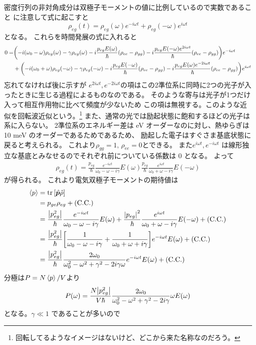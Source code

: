 \documentclass[11pt,dvipdfmx,a4paper]{jsarticle}
\newcommand{\cc}{\text{(C.C.)}}
\begin{document}
密度行列の非対角成分は双極子モーメントの値に比例しているので実数であること
に注意して式に起こすと
\begin{equation}
	\rho_{eg}(t) = \rho_{eg}( \omega) e^{-i\omega t} + \rho_{eg}(-\omega) e^{ i\omega t}
\end{equation}
となる。
これらを時間発展の式に入れると
\begin{align}
	0 =& \qty(-i(\omega_0-\omega)\rho_{eg}( \omega) -\gamma\rho_{eg}( \omega) -i\frac{p_{eg}E( \omega)}{\hbar}(\rho_{ee}-\rho_{gg})-i\frac{p_{eg}E(-\omega)e^{ 2i\omega t}}{\hbar}(\rho_{ee}-\rho_{gg}))e^{-i\omega t} \notag\\
	  &+ \qty(-i(\omega_0+\omega)\rho_{eg}(-\omega) -\gamma\rho_{eg}(-\omega) -i\frac{p_{eg}E(-\omega)}{\hbar}(\rho_{ee}-\rho_{gg})-i\frac{p_{eg}E( \omega)e^{-2i\omega t}}{\hbar}(\rho_{ee}-\rho_{gg}))e^{ i\omega t}
\end{align}
忘れてなければ後に示すが
\(e^{2i\omega t}, e^{-2i\omega t}\)の項はこの2準位系に同時に2つの光子が入ったときに生じる過程によるものなのである。
そのような寄与は光子が1つだけ入って相互作用物に比べて頻度が少ないため
この項は無視する。このような近似を回転波近似という。\footnote{回転してるようなイメージはないけど、どこから来た名称なのだろう。}
また、通常の光では励起状態に飽和するほどの光子は系に入らない。
2準位系のエネルギー差は eV オーダーなのに対し、熱ゆらぎは 10 meV のオーダーであるためであるため、
励起した電子はすぐさま基底状態に戻ると考えられる。
これより\(\rho_{gg} = 1,\,\rho_{ee} = 0\)とできる。
また\(e^{i\omega t}, e^{-i\omega t}\) は線形独立な基底とみなせるのでそれぞれ前についている係数は 0 となる。
よって
\begin{align}
	\rho_{eg}(t)
	= \frac{p_{eg}}{\hbar}\frac{e^{-i\omega t}}{\omega_0 - \omega - i\gamma} E( \omega)
	  \frac{p_{eg}}{\hbar}\frac{e^{ i\omega t}}{\omega_0 + \omega - i\gamma} E(-\omega)
\end{align}
が得られる。
これより電気双極子モーメントの期待値は
\begin{align}
	\ev{p} &= \tr\qty[\hat{\vb*{p}}\hat{\rho}]\\
	&=p_{ge}\rho_{eg}+\cc\\
	&=\frac{\abs{p_{eg}^2}}{\hbar}\frac{e^{-i\omega t}}{\omega_0 - \omega - i\gamma} E( \omega)
	+ \frac{\abs{p_{eg}}^2}{\hbar}\frac{e^{ i\omega t}}{\omega_0 + \omega - i\gamma} E(-\omega)
	+ \cc\\
	&=\frac{\abs{p_{eg}^2}}{\hbar}\qty[
		 \frac{1}{\omega_0 - \omega - i\gamma}
		+\frac{1}{\omega_0 + \omega + i\gamma}]
	e^{-i\omega t}E(\omega) + \cc\\
	&=\frac{\abs{p_{eg}^2}}{\hbar}
	\frac{2\omega_0}{\omega_0^2-\omega^2 + \gamma^2 -2i\gamma\omega}
	e^{-i\omega t} E(\omega) + \cc
\end{align}
分極は\(P=N\ev{p}/V\)より
\begin{equation}
	P(\omega) = \frac{N\abs{p_{eg}^2}}{V\hbar}
	\frac{2\omega_0}{\omega_0^2-\omega^2 + \gamma^2 -2i\gamma}\omega E(\omega)
\end{equation}
となる。\(\gamma \ll 1\) であることが多いので
\end{document}
